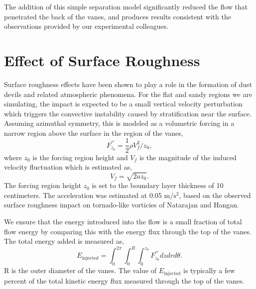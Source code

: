 
The addition of this simple separation model significantly reduced the
flow that penetrated the back of the vanes, and produces results
consistent with the observations provided by our experimental
colleagues.  

\section{Effect of Surface Roughness}


Surface roughness effects have been shown to play a role in the
formation of dust devils and related atmospheric
phenomena\cite{oke1987boundary}. For the flat and sandy
regions we are simulating, the impact is expected to be a small vertical 
velocity perturbation which triggers the convective instability caused
by stratification near the surface. 
Assuming azimuthal symmetry, this is modeled as a volumetric forcing in
a narrow region above the surface in the region of the vanes,  
\begin{equation}
 F^{'''}_{z_0} = \frac{1}{2}\rho V_f^2/z_{0}, 
\end{equation}
where $z_{0}$ is the forcing region height and $V_f$ is the magnitude of
 the  induced velocity fluctuation which is estimated as, 
\begin{equation}
V_f = \sqrt{2 a z_0}.
\end{equation}
The forcing region height $z_0$ is set to the boundary layer thickness
of 10 centimeters. The acceleration was estimated at 0.05
$\text{m}/\text{s}^2$, based on the observed surface roughness impact on
tornado-like vorticies of Natarajan and Hangan\cite{Natarajan2012577}.

We ensure that the energy
introduced into the flow is a small fraction of total flow energy by comparing
this with the energy flux through the top of the vanes. The total energy
added is measured as,  
\begin{equation}
 E_{\text{injected}} = \int_0^{2\pi} \int_0^R \int_0^{z_0} F^{'''}_{z_0}
  dz dr d\theta.  
\end{equation}
R is the outer diameter of the vanes. 
The value of $E_{\text{injected}}$ is typically a few percent of the
total kinetic energy flux measured through the top of the
vanes.

